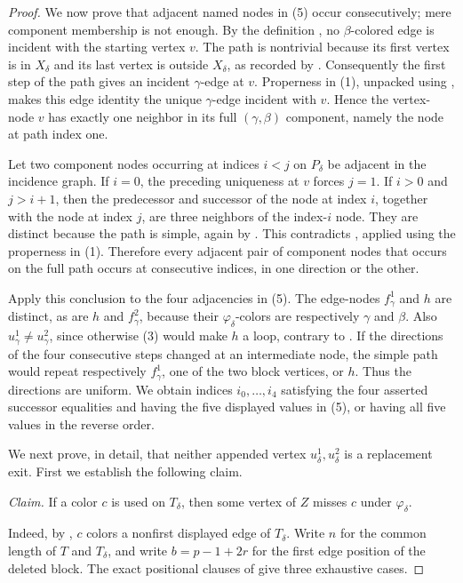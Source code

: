 \begin{proof}
We now prove that adjacent named nodes in (5) occur consecutively; mere
component membership is not enough.  By the definition
, no $\beta$-colored edge is incident with the
starting vertex $v$.  The path is nontrivial because its first vertex is
in $X_\delta$ and its last vertex is outside $X_\delta$, as recorded by
.  Consequently the first step of the
path gives an incident $\gamma$-edge at $v$.  Properness in (1), unpacked
using , makes this edge identity the unique
$\gamma$-edge incident with $v$.  Hence the vertex-node $v$ has exactly
one neighbor in its full $(\gamma,\beta)$ component, namely the node at
path index one.

Let two component nodes occurring at indices $i<j$ on $P_\delta$ be
adjacent in the incidence graph.  If $i=0$, the preceding uniqueness at
$v$ forces $j=1$.  If $i>0$ and $j>i+1$, then the predecessor and
successor of the node at index $i$, together with the node at index $j$,
are three neighbors of the index-$i$ node.  They are distinct because
the path is simple, again by
.  This contradicts
, applied using the properness
in (1).  Therefore every adjacent pair of component nodes that occurs on
the full path occurs at consecutive indices, in one direction or the
other.

Apply this conclusion to the four adjacencies in (5).  The edge-nodes
$f^1_\gamma$ and $h$ are distinct, as are $h$ and $f^2_\gamma$, because
their $\varphi_\delta$-colors are respectively $\gamma$ and $\beta$.
Also $u^1_\gamma\ne u^2_\gamma$, since otherwise (3) would make $h$ a
loop, contrary to .  If the directions of
the four consecutive steps changed at an intermediate node, the simple
path would repeat respectively $f^1_\gamma$, one of the two block
vertices, or $h$.  Thus the directions are uniform.  We obtain indices
$i_0,\ldots,i_4$ satisfying the four asserted successor equalities and
having the five displayed values in (5), or having all five values in
the reverse order.

We next prove, in detail, that neither appended vertex
$u^1_\delta,u^2_\delta$ is a replacement exit.  First we establish the
following claim.

\emph{Claim.}  If a color $c$ is used on $T_\delta$, then some vertex of
$Z$ misses $c$ under $\varphi_\delta$.

Indeed, by , $c$ colors a nonfirst displayed
edge of $T_\delta$.  Write $n$ for the common length of $T$ and
$T_\delta$, and write $b=p-1+2r$ for the first edge position of the
deleted block.  The exact positional clauses of
 give three exhaustive cases.


\end{proof}
